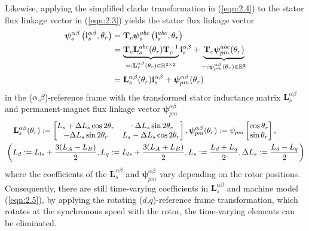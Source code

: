 Likewise, applying the simplified clarke transformation in (\ref{eqn:2.4}) to the stator flux linkage vector in (\ref{eqn:2.3}) yields the stator flux linkage vector
\begin{align}\label{eqn:2.7}\notag
\boldsymbol{\psi}^{\alpha\beta}_s\left(\mathbf{i}^{\alpha\beta}_s,\theta_r \right) &= \mathbf{T}_c\boldsymbol{\psi}^{abc}_s\left(\mathbf{i}^{abc}_s,\theta_r \right) \\\notag
&= \underbrace{\mathbf{T}_c\mathbf{L}^{abc}_s(\theta_r)\mathbf{T}^{-1}_c}_{=:\mathbf{L}^{\alpha\beta}_s(\theta_r)\in \mathbb{R}^{2\times2}}\mathbf{i}^{\alpha\beta}_s+\underbrace{\mathbf{T}_c\boldsymbol{\psi}^{abc}_{pm}(\theta_r)}_{=:\boldsymbol{\psi}^{\alpha\beta}_{pm}(\theta_r)\in \mathbb{R}^{2}}
\\
&= \mathbf{L}^{\alpha\beta}_s(\theta_r)\mathbf{i}^{\alpha\beta}_s
+ \boldsymbol{\psi}^{\alpha\beta}_{pm}(\theta_r)
\end{align}
in the ($\alpha$,$\beta$)-reference frame with the transformed stator inductance matrix $\mathbf{L}^{\alpha\beta}_s$ and permanent-magnet flux linkage vector $\boldsymbol{\psi}^{\alpha\beta}_{pm}$
\begin{align}\label{eqn:2.8}
&\hfil \quad \mathbf{L}^{\alpha\beta}_s(\theta_r) := 
\begin{bmatrix}
L_s + \Delta L_s \cos 2\theta_r & -\Delta L_s \sin 2\theta_r \\
-\Delta L_s \sin 2\theta_r & L_s - \Delta L_s \cos 2\theta_r 
  \end{bmatrix}, \boldsymbol{\psi}^{\alpha\beta}_{pm}(\theta_r):=\psi_{pm}\begin{bmatrix}
\cos \theta_r \\
\sin \theta_r 
  \end{bmatrix},
\\
&\hfil \left( L_d := L_{ls} + \frac{3(L_A - L_B)}{2},L_q := L_{ls} + \frac{3(L_A + L_B)}{2}, L_s := \frac{L_d+L_q}{2}, \Delta L_s := \frac{L_d-L_q}{2}\right)\notag
\end{align}
where the coefficients of the $\mathbf{L}^{\alpha\beta}_s$ and $\boldsymbol{\psi}^{\alpha\beta}_{pm}$ vary depending on the rotor positions. Consequently, there are still time-varying coefficients in \(\mathbf{L}^{\alpha\beta}_s\) and machine model (\ref{eqn:2.5}), by applying the rotating ($d$,$q$)-reference frame transformation, which rotates at the synchronous speed with the rotor, the time-varying elements can be eliminated.

